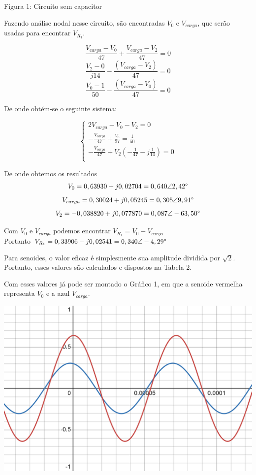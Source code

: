 \documentclass[a4 paper]{article}
\begin{document}
\begin{center}
Figura 1: Circuito sem capacitor
\end{center}

Fazendo análise nodal nesse circuito, são encontradas $V_0$ e $V_{carga}$, que serão usadas para encontrar $V_{R_1}$. 

\[\frac{V_{carga}-V_0}{47}+\frac{V_{carga}-V_2}{47}=0\]
\[\frac{V_2-0}{j14}-\frac{(V_{carga}-V_2)}{47}=0\]
\[\frac{V_0-1}{50}-\frac{(V_{carga}-V_0)}{47}=0\]


De onde obtém-se o seguinte sistema:

\begin{equation*}
\left\{
\begin{aligned}
2V_{carga}-V_0-V_2=0\\
-\frac{V_{carga}}{47} + \frac{V_0}{97} = \frac{1}{50}\\
-\frac{V_{carga}}{47} + V_2\left(-\frac{1}{47}-j\frac{1}{14}\right)=0\\
\end{aligned}\right.
\end{equation*}

\newpage
De onde obtemos os resultados 
\[V_0 = 0,63930+j0,02704=0,640\angle 2,42\text{\textdegree}\]
\[V_{carga}=0,30024+j0,05245=0,305\angle 9,91\text{\textdegree}\]
\[V_2=-0,038820+j0,077870=0,087\angle -63,50\text{\textdegree}\]

Com $V_0$ e $V_{carga}$ podemos encontrar $V_{R_1}=V_0-V_{carga}$\\
Portanto $V_{R_1}=0,33906-j0,02541=0,340\angle-4,29\text{\textdegree}$ 

Para senoides, o valor eficaz é simplesmente sua amplitude dividida por $\sqrt{2}$. Portanto, esses valores são calculados e dispostos na Tabela 2.

Com esses valores já pode ser montado o Gráfico 1, em que a senoide vermelha representa $V_0$ e a azul $V_{carga}$.

\vspace{3cm}
\begin{table}[h]
\centering
\includegraphics[scale=0.25]{rgadicoas/grafico1}
\end{table}
\end{document}
